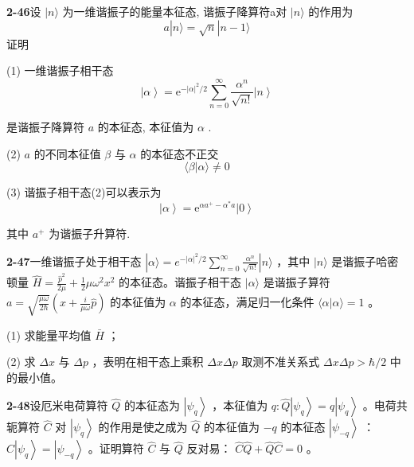 \vfill

\newpage
\vfill

\noindent
\textbf{2-46}\quad 设 $|n\rangle$ 为一维谐振子的能量本征态, 谐振子降算符a对 $|n\rangle$ 的作用为
\begin{equation}\tag{1}
a | n \rangle = \sqrt {n} | n - 1 \rangle
\end{equation}
证明

(1) 一维谐振子相干态
\begin{equation}\tag{2}
\left| \alpha \right\rangle = \mathrm{e} ^ {- \left| \alpha \right| ^ {2} / 2} \sum_ {n = 0} ^ {\infty} \frac {\alpha^ {n}}{\sqrt {n !}} \left| n \right\rangle
\end{equation}

是谐振子降算符 $a$ 的本征态, 本征值为 $\alpha$ . 

(2) $a$ 的不同本征值 $\beta$ 与 $\alpha$ 的本征态不正交
\begin{equation}\tag{3}
\langle \beta | \alpha \rangle \neq 0
\end{equation}

(3) 谐振子相干态(2)可以表示为
\begin{equation}\tag{4}
\left| \alpha \right\rangle = \mathrm{e} ^ {\alpha a ^ {+} - \alpha^ {*} a} \left| 0 \right\rangle
\end{equation}

其中 $a^{+}$ 为谐振子升算符.

\vfill

\newpage
\vfill

\noindent
\textbf{2-47}\quad 一维谐振子处于相干态 $|\alpha\rangle = e^{-|\alpha|^2 / 2}\sum_{n=0}^{\infty} \frac{\alpha^n}{\sqrt{n!}} |n\rangle$ ，其中 $|n\rangle$ 是谐振子哈密顿量 $\hat{H} = \frac{\hat{p}^2}{2\mu} + \frac{1}{2}\mu \omega^2 x^2$ 的本征态。谐振子相干态 $|\alpha\rangle$ 是谐振子算符 $a = \sqrt{\frac{\mu \omega}{2\hbar}} \left(x + \frac{i}{\mu \omega} \hat{p}\right)$ 的本征值为 $\alpha$ 的本征态，满足归一化条件 $\langle \alpha | \alpha \rangle = 1$ 。

(1) 求能量平均值 $\bar{H}$ ；

(2) 求 $\Delta x$ 与 $\Delta p$ ，表明在相干态上乘积 $\Delta x \Delta p$ 取测不准关系式 $\Delta x \Delta p > \hbar / 2$ 中的最小值。

\vfill

\newpage
\vfill

\noindent
\textbf{2-48}\quad 设厄米电荷算符 $\hat{Q}$ 的本征态为 $\left|\psi_q\right\rangle$ ，本征值为 $q: \hat{Q} \left|\psi_q\right\rangle = q \left|\psi_q\right\rangle$ 。电荷共轭算符 $\hat{C}$ 对 $\left|\psi_q\right\rangle$ 的作用是使之成为 $\hat{Q}$ 的本征值为 $-q$ 的本征态 $\left|\psi_{-q}\right\rangle$ ： $\hat{C} \left|\psi_q\right\rangle = \left|\psi_{-q}\right\rangle$ 。证明算符 $\hat{C}$ 与 $\hat{Q}$ 反对易： $\hat{C}\hat{Q} + \hat{Q}\hat{C} = 0$ 。

\vfill

\newpage